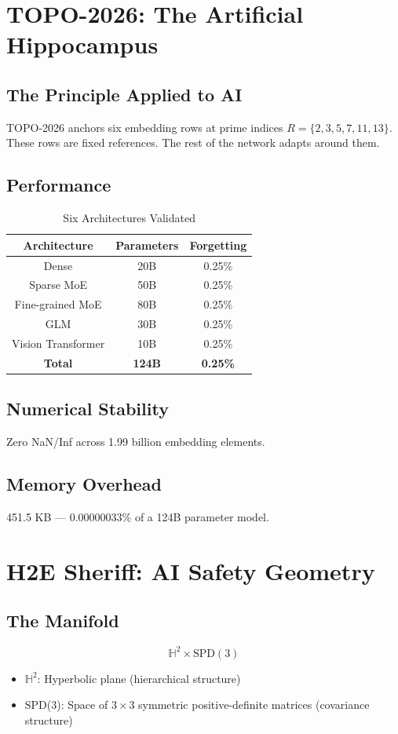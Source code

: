 \documentclass[12pt,a4paper]{article}
\begin{document}
\section{TOPO-2026: The Artificial Hippocampus}

\subsection{The Principle Applied to AI}
TOPO-2026 anchors six embedding rows at prime indices $R = \{2,3,5,7,11,13\}$. These rows are fixed references. The rest of the network adapts around them.

\subsection{Performance}
\begin{table}[htbp]
\centering
\begin{tabular}{ccc}
\toprule
Architecture & Parameters & Forgetting \\
\midrule
Dense & 20B & 0.25\% \\
Sparse MoE & 50B & 0.25\% \\
Fine-grained MoE & 80B & 0.25\% \\
GLM & 30B & 0.25\% \\
Vision Transformer & 10B & 0.25\% \\
\midrule
\textbf{Total} & \textbf{124B} & \textbf{0.25\%} \\
\bottomrule
\end{tabular}
\caption{Six Architectures Validated}
\label{tab:architectures}
\end{table}

\subsection{Numerical Stability}
Zero NaN/Inf across 1.99 billion embedding elements.

\subsection{Memory Overhead}
451.5 KB --- 0.00000033\% of a 124B parameter model.

\section{H2E Sheriff: AI Safety Geometry}

\subsection{The Manifold}
\begin{equation}
\mathbb{H}^2 \times \text{SPD}(3)
\label{eq:manifold}
\end{equation}
\begin{itemize}
\item $\mathbb{H}^2$: Hyperbolic plane (hierarchical structure)
\item SPD(3): Space of $3 \times 3$ symmetric positive-definite matrices (covariance structure)
\end{itemize}
\end{document}
